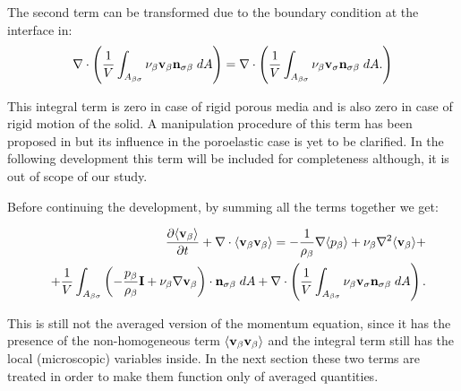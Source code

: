 The second term can be transformed due to the boundary condition at the interface in:
$$
\nabla \cdot \left( \dfrac{1}{V} \int_{A_{\beta \sigma}}  \nu_{\beta} \textbf{v}_{\beta} \mathbf{n}_{\sigma \beta} \;dA \right) = \nabla \cdot \left( \dfrac{1}{V} \int_{A_{\beta \sigma}}  \nu_{\beta} \textbf{v}_{\sigma} \mathbf{n}_{\sigma \beta} \;dA. \right)
$$

\noindent This integral term is zero in case of rigid porous media and is also zero in case of rigid motion of the solid. A manipulation procedure of this term has been proposed in \citet{hussong2011continuum} but its influence in the poroelastic case is yet to be clarified. In the following development this term will be included for completeness although, it is out of scope of our study.



\noindent Before continuing the development, by summing all the terms together we get:

\begin{eqnarray}
&& \dfrac{\partial {\left< \textbf{v}_{\beta}\right>}}{\partial t} + \nabla \cdot {\left< \textbf{v}_{\beta}\textbf{v}_{\beta}\right>} = -\dfrac{1}{\rho_{\beta}} \nabla {\left< p_{\beta}\right>} + \nu_{\beta}\nabla^2 {\left< \textbf{v}_{\beta} \right>} + \nonumber \\
&& +\dfrac{1}{V} \int_{A_{\beta \sigma}} \left( -\dfrac{p_{\beta}}{\rho_{\beta}} \mathbf{I} + \nu_{\beta} \nabla \textbf{v}_{\beta}  \right)\cdot \mathbf{n}_{\sigma \beta} \;dA +  \nabla \cdot \left( \dfrac{1}{V} \int_{A_{\beta \sigma}}  \nu_{\beta} \textbf{v}_{\sigma} \mathbf{n}_{\sigma \beta} \;dA \right). \nonumber
\label{eq:mom_2}
\end{eqnarray}

This is still not the averaged version of the momentum equation, since it has the presence of the non-homogeneous term ${\left< \textbf{v}_{\beta}\textbf{v}_{\beta} \right>}$ and the integral term still has the local (microscopic) variables inside.
In the next section these two terms are treated in order to make them function only of averaged quantities.

